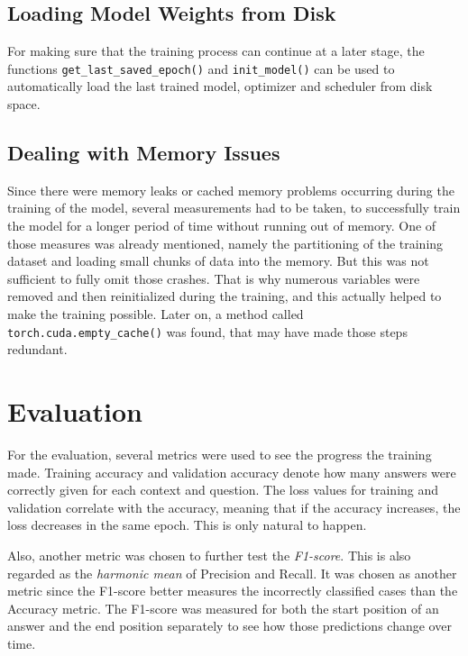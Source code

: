         \subsection{Loading Model Weights from Disk}
        \label{sec:-loading-model-weights-from-disk}
            For making sure that the training process can continue at a later stage, the functions \texttt{get\_last\_saved\_epoch()} and \texttt{init\_model()} can be used to automatically load the last trained model, optimizer and scheduler from disk space.

        \subsection{Dealing with Memory Issues}
        \label{sec:-dealing-with-memory-issues}
            Since there were memory leaks or cached memory problems occurring during the training of the model, several measurements had to be taken, to successfully train the model for a longer period of time without running out of memory. One of those measures was already mentioned, namely the partitioning of the training dataset and loading small chunks of data into the memory.
            But this was not sufficient to fully omit those crashes. That is why numerous variables were removed and then reinitialized during the training, and this actually helped to make the training possible.
            Later on, a method called \texttt{torch.cuda.empty\_cache()} was found, that may have made those steps redundant.
        

    \section{Evaluation}
    \label{sec:evaluation}

        For the evaluation, several metrics were used to see the progress the training made. Training accuracy and validation accuracy denote how many answers were correctly given for each context and question. The loss values for training and validation correlate with the accuracy, meaning that if the accuracy increases, the loss decreases in the same epoch. This is only natural to happen.
        
        Also, another metric was chosen to further test the \emph{F1-score}. This is also regarded as the \emph{harmonic mean} of Precision and Recall. It was chosen as another metric since the F1-score better measures the incorrectly classified cases than the Accuracy metric. 
        The F1-score was measured for both the start position of an answer and the end position separately to see how those predictions change over time.

